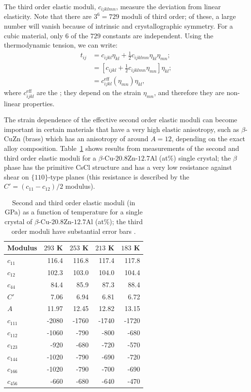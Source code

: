The third order elastic moduli, $c_{ijklmn}$, measure the deviation from linear elasticity.  Note that there are $3^6=729$ moduli of third order; of these, a large number will vanish because of intrinsic and crystallographic symmetry. For a cubic material, only $6$ of the $729$ constants are independent. Using the thermodynamic tension, we can write:
\begin{align*}
	t_{ij} &= c_{ijkl} \eta_{kl} + \frac{1}{2}c_{ijklmn}\eta_{kl}\eta_{mn};\\
	&= \left[ c_{ijkl}+\frac{1}{2}c_{ijklmn}\eta_{mn}\right] \eta_{kl};\\
	&= c_{ijkl}^{\text{eff}}(\eta_{mn}) \eta_{kl},
\end{align*}
where $c^{\text{eff}}_{ijkl}$ are the ; they depend on the strain $\eta_{mn}$, and therefore they are non-linear properties.

The strain dependence of the effective second order elastic moduli can become important in certain materials that have a very high elastic anisotropy, such as $\beta$-CuZn (brass) which has an anisotropy of around $A=12$, depending on the exact alloy composition.  Table~\ref{\chabbr:tb:brass} shows results from measurements of the second and third order elastic moduli for a $\beta$-Cu-$20.8$Zn-$12.7$Al (at\%) single crystal; the $\beta$ phase has the primitive CsCl structure and has a very low resistance against shear on $\{110\}$-type planes (this resistance is described by the $C'=(c_{11}-c_{12})/2$ modulus). 

\begin{table}[ht]
\centering\leavevmode
\begin{tabular}{|l|rrrr|}
\hline
Modulus & $293$ K & $253$ K & $213$ K & $183$ K \\
\hline\hline
$c_{11}$ & 116.4 & 116.8 & 117.4 & 117.8 \\
$c_{12}$ & 102.3 & 103.0 & 104.0 & 104.4 \\
$c_{44}$ & 84.4 & 85.9 & 87.3 & 88.4 \\
$C'$        & 7.06 & 6.94 & 6.81 & 6.72 \\
$A$         & 11.97 & 12.45 & 12.82 & 13.15 \\
\hline
$c_{111}$ & -2080 & -1760 & -1740 & -1720\\
$c_{112}$ & -1060 & -790 & -800 & -680 \\
$c_{123}$ & -920 & -680 & -720 & -570\\
$c_{144}$ & -1020 & -790 & -690 & -720\\
$c_{166}$ & -1020 & -790 & -700 & -690\\
$c_{456}$ & -660 & -680 & -640 & -470 \\
\hline
\end{tabular}
\caption{\label{\chabbr:tb:brass}Second and third order elastic moduli (in GPa) as a function of temperature for a single crystal of $\beta$-Cu-$20.8$Zn-$12.7$Al (at\%); the third order moduli have substantial error bars \protect\cite{verlinden1987a}.}
\end{table}

